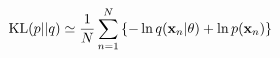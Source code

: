 $${\rm KL}(p || q) \simeq \frac{1}{N}\sum_{n=1}^{N}\left\{ - \ln q({\bf x}_n | {\bf \theta}) + \ln p({\bf x}_n) \right\} $$

